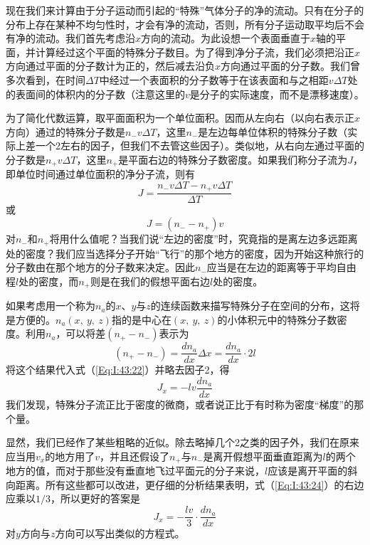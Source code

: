 现在我们来计算由于分子运动而引起的“特殊”气体分子的净的流动。只有在分子的分布上存在某种不均匀性时，才会有净的流动，否则，所有分子运动取平均后不会有净的流动。我们首先考虑沿$x$方向的流动。为此设想一个表面垂直于$x$轴的平面，并计算经过这个平面的特殊分子数目。为了得到净分子流，我们必须把沿正$x$方向通过平面的分子数计为正的，然后减去沿负$x$方向通过平面的分子数。我们曾多次看到，在时间$\Delta T$中经过一个表面积的分子数等于在该表面和与之相距$v \Delta T$处的表面间的体积内的分子数（注意这里的$v$是分子的实际速度，而不是漂移速度）。

为了简化代数运算，取平面面积为一个单位面积。因而从左向右（以向右表示正$x$方向）通过的特殊分子数是$n_-v \Delta T$，这里$n_-$是左边每单位体积的特殊分子数（实际上差一个2左右的因子，但我们不去管这些因子）。类似地，从右向左通过平面的分子数是$n_+ v \Delta T$，这里$n_+$是平面右边的特殊分子数密度。如果我们称分子流为$J$，即单位时间通过单位面积的净分子流，则有
\begin{equation}
    \label{Eq:I:43:21}
    J=\frac{n_-v \Delta T - n_+ v \Delta T}{\Delta T}
\end{equation}
或
\begin{equation}
    \label{Eq:I:43:22}
    J=(n_- - n_+)v
\end{equation}
对$n_-$和$n_+$将用什么值呢？当我们说“左边的密度”时，究竟指的是离左边多远距离处的密度？我们应当选择分子开始“飞行”的那个地方的密度，因为开始这种旅行的分子数由在那个地方的分子数来决定。因此$n_-$应当是在左边的距离等于平均自由程$l$处的密度，而$n_+$则是在我们的假想平面右边$l$处的密度。

如果考虑用一个称为$n_a$的$x$、$y$与$z$的连续函数来描写特殊分子在空间的分布，这将是方便的。$n_a(x,~y,~z)$指的是中心在$(x,~y,~z)$的小体积元中的特殊分子数密度。利用$n_a$，可以将差$(n_+ -n_-)$表示为
\begin{equation}
    \label{Eq:I:43:23}
    (n_+ -n_-) = \frac{dn_a}{dx} \Delta x = \frac{dn_a}{dx} \cdot 2l
\end{equation}
将这个结果代入式（\ref{Eq:I:43:22}）并略去因子2，得
\begin{equation}
    \label{Eq:I:43:24}
    J_x = -lv\frac{dn_a}{dx}
\end{equation}
我们发现，特殊分子流正比于密度的微商，或者说正比于有时称为密度“梯度”的那个量。

显然，我们已经作了某些粗略的近似。除去略掉几个2之类的因子外，我们在原来应当用$v_x$的地方用了$v$，并且还假设了$n_+$与$n_-$是离开假想平面垂直距离为$l$的两个地方的值，而对于那些没有垂直地飞过平面元的分子来说，$l$应该是离开平面的斜向距离。所有这些都可以改进，更仔细的分析结果表明，式（\ref{Eq:I:43:24}）的右边应乘以$1/3$，所以更好的答案是
\begin{equation}
    \label{Eq:I:43:25}
    J_x = -\frac{lv}{3}\cdot\frac{dn_a}{dx}
\end{equation}
对$y$方向与$z$方向可以写出类似的方程式。

